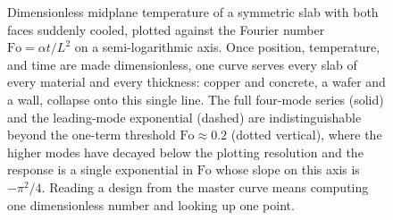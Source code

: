 \begin{figure}[htbp]
\centering
{}
\caption[The Fourier-number master curve for a slab]{Dimensionless
midplane temperature of a symmetric slab with both faces suddenly
cooled, plotted against the Fourier number $\mathrm{Fo} = \alpha
t/L^{2}$ on a semi-logarithmic axis. Once position, temperature, and
time are made dimensionless, one curve serves every slab of every
material and every thickness: copper and concrete, a wafer and a
wall, collapse onto this single line. The full four-mode series (solid)
and the leading-mode exponential (dashed) are indistinguishable beyond
the one-term threshold $\mathrm{Fo} \approx 0.2$ (dotted vertical),
where the higher modes have decayed below the plotting resolution and
the response is a single exponential in $\mathrm{Fo}$ whose slope on
this axis is $-\pi^{2}/4$. Reading a design from the master curve
means computing one dimensionless number and looking up one point.}
\label{fig:vol02:ch12:fourier-number}
\end{figure}
